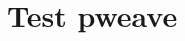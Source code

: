 \documentclass[a4paper,bahasa,10pt]{extbook}
\begin{document}



\chapter{Test pweave}

%
%
\end{document}

